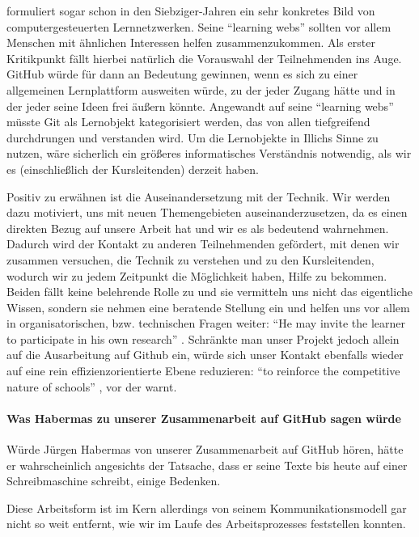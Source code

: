 \citeauthor{Illich-1971} formuliert sogar schon in den Siebziger-Jahren ein sehr konkretes Bild von computergesteuerten Lernnetzwerken.
Seine ``learning webs'' sollten vor allem Menschen mit ähnlichen Interessen helfen zusammenzukommen.
Als erster Kritikpunkt fällt hierbei natürlich die Vorauswahl der Teilnehmenden ins Auge.
GitHub würde für \citeauthor{Illich-1971} dann an Bedeutung gewinnen, wenn es sich zu einer allgemeinen Lernplattform ausweiten würde, zu der jeder Zugang hätte und in der jeder seine Ideen frei äußern könnte.
Angewandt auf seine ``learning webs'' müsste Git als Lernobjekt kategorisiert werden, das von allen tiefgreifend durchdrungen und verstanden wird.
Um die Lernobjekte in Illichs Sinne zu nutzen, wäre sicherlich ein größeres informatisches Verständnis notwendig, als wir es (einschließlich der Kursleitenden) derzeit haben.

Positiv zu erwähnen ist die Auseinandersetzung mit der Technik.
Wir werden dazu motiviert, uns mit neuen Themengebieten auseinanderzusetzen, da es einen direkten Bezug auf unsere Arbeit hat und wir es als bedeutend wahrnehmen.
Dadurch wird der Kontakt zu anderen Teilnehmenden gefördert, mit denen wir zusammen versuchen, die Technik zu verstehen und zu den Kursleitenden, wodurch wir zu jedem Zeitpunkt die Möglichkeit haben, Hilfe zu bekommen.
Beiden fällt keine belehrende Rolle zu und sie vermitteln uns nicht das eigentliche Wissen, sondern sie nehmen eine beratende Stellung ein und helfen uns vor allem in organisatorischen, bzw. technischen Fragen weiter:
``He may invite the learner to participate in his own research'' \parencite[43]{Illich-1971}.
Schränkte man unser Projekt jedoch allein auf die Ausarbeitung auf Github ein, würde sich unser Kontakt ebenfalls wieder auf eine rein effizienzorientierte Ebene reduzieren: ``to reinforce the competitive nature of schools'' \parencite[35]{Illich-1971}, vor der \citeauthor{Illich-1971} warnt.


\paragraph{Was Habermas zu unserer Zusammenarbeit auf GitHub sagen würde}

Würde Jürgen Habermas von unserer Zusammenarbeit auf GitHub hören, hätte er wahrscheinlich angesichts der Tatsache, dass er seine Texte bis heute auf einer Schreibmaschine schreibt, einige Bedenken.

Diese Arbeitsform ist im Kern allerdings von seinem Kommunikationsmodell gar nicht so weit entfernt, wie wir im Laufe des Arbeitsprozesses feststellen konnten.

